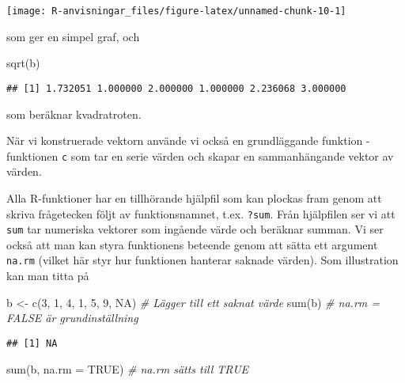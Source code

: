 \documentclass[
]{book}
\newenvironment{Shaded}{\begin{snugshade}}{\end{snugshade}}
\newcommand{\AttributeTok}[1]{\textcolor[rgb]{0.77,0.63,0.00}{#1}}
\newcommand{\CommentTok}[1]{\textcolor[rgb]{0.56,0.35,0.01}{\textit{#1}}}
\newcommand{\ConstantTok}[1]{\textcolor[rgb]{0.00,0.00,0.00}{#1}}
\newcommand{\DecValTok}[1]{\textcolor[rgb]{0.00,0.00,0.81}{#1}}
\newcommand{\FunctionTok}[1]{\textcolor[rgb]{0.00,0.00,0.00}{#1}}
\newcommand{\NormalTok}[1]{#1}
\newcommand{\OtherTok}[1]{\textcolor[rgb]{0.56,0.35,0.01}{#1}}
\theoremstyle{definition}
\theoremstyle{definition}
\theoremstyle{definition}
\theoremstyle{definition}
\theoremstyle{remark}
\begin{document}
\begin{center}\texttt{[image: R-anvisningar\_files/figure-latex/unnamed-chunk-10-1]} \end{center}

som ger en simpel graf, och

\begin{Shaded}
\begin{Highlighting}[]
\FunctionTok{sqrt}\NormalTok{(b)}
\end{Highlighting}
\end{Shaded}

\begin{verbatim}
## [1] 1.732051 1.000000 2.000000 1.000000 2.236068 3.000000
\end{verbatim}

som beräknar kvadratroten.

När vi konstruerade vektorn använde vi också en grundläggande funktion - funktionen \texttt{c} som tar en serie värden och skapar en sammanhängande vektor av värden.

Alla R-funktioner har en tillhörande hjälpfil som kan plockas fram genom att skriva frågetecken följt av funktionsnamnet, t.ex. \texttt{?sum}. Från hjälpfilen ser vi att \texttt{sum} tar numeriska vektorer som ingående värde och beräknar summan. Vi ser också att man kan styra funktionens beteende genom att sätta ett argument \texttt{na.rm} (vilket här styr hur funktionen hanterar saknade värden). Som illustration kan man titta på

\begin{Shaded}
\begin{Highlighting}[]
\NormalTok{b }\OtherTok{\textless{}{-}} \FunctionTok{c}\NormalTok{(}\DecValTok{3}\NormalTok{, }\DecValTok{1}\NormalTok{, }\DecValTok{4}\NormalTok{, }\DecValTok{1}\NormalTok{, }\DecValTok{5}\NormalTok{, }\DecValTok{9}\NormalTok{, }\ConstantTok{NA}\NormalTok{)  }\CommentTok{\# Lägger till ett saknat värde}
\FunctionTok{sum}\NormalTok{(b)                        }\CommentTok{\# na.rm = FALSE är grundinställning}
\end{Highlighting}
\end{Shaded}

\begin{verbatim}
## [1] NA
\end{verbatim}

\begin{Shaded}
\begin{Highlighting}[]
\FunctionTok{sum}\NormalTok{(b, }\AttributeTok{na.rm =} \ConstantTok{TRUE}\NormalTok{)          }\CommentTok{\# na.rm sätts till TRUE}
\end{Highlighting}
\end{Shaded}
\end{document}

